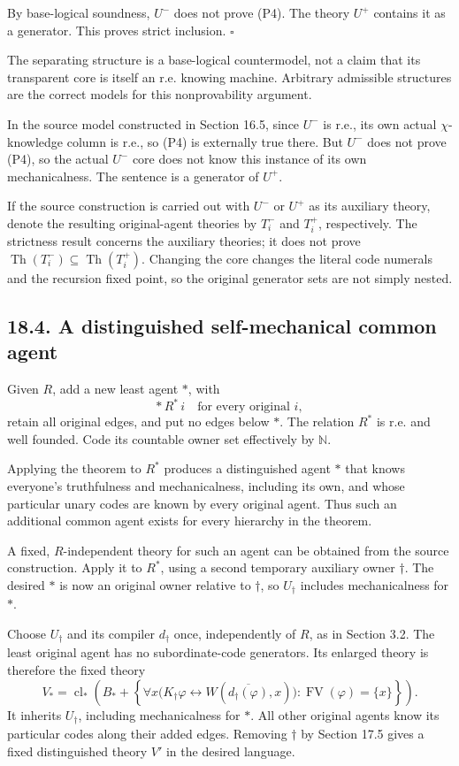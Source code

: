 \documentclass[
  11pt,
  letterpaper,
]{article}
\begin{document}
By base-logical soundness, \(U^-\) does not prove (P4). The theory
\(U^+\) contains it as a generator. This proves strict inclusion.
\(\square\)

The separating structure is a base-logical countermodel, not a claim
that its transparent core is itself an r.e. knowing machine. Arbitrary
admissible structures are the correct models for this nonprovability
argument.

In the source model constructed in Section 16.5, since \(U^-\) is r.e.,
its own actual \(\chi\)-knowledge column is r.e., so (P4) is externally
true there. But \(U^-\) does not prove (P4), so the actual \(U^-\) core
does not know this instance of its own mechanicalness. The sentence is a
generator of \(U^+\).

If the source construction is carried out with \(U^-\) or \(U^+\) as its
auxiliary theory, denote the resulting original-agent theories by
\(T_i^-\) and \(T_i^+\), respectively. The strictness result concerns
the auxiliary theories; it does not prove
\(\operatorname{Th}(T_i^-)\subseteq\operatorname{Th}(T_i^+)\). Changing
the core changes the literal code numerals and the recursion fixed
point, so the original generator sets are not simply nested.

\subsection{18.4. A distinguished self-mechanical common
agent}\label{a-distinguished-self-mechanical-common-agent}

Given \(R\), add a new least agent \(*\), with \[
*\,R^*\,i\quad\text{for every original }i,
\] retain all original edges, and put no edges below \(*\). The relation
\(R^*\) is r.e. and well founded. Code its countable owner set
effectively by \(\mathbb N\).

Applying the theorem to \(R^*\) produces a distinguished agent \(*\)
that knows everyone's truthfulness and mechanicalness, including its
own, and whose particular unary codes are known by every original agent.
Thus such an additional common agent exists for every hierarchy in the
theorem.

A fixed, \(R\)-independent theory for such an agent can be obtained from
the source construction. Apply it to \(R^*\), using a second temporary
auxiliary owner \(\dagger\). The desired \(*\) is now an original owner
relative to \(\dagger\), so \(U_\dagger\) includes mechanicalness for
\(*\).

Choose \(U_\dagger\) and its compiler \(d_\dagger\) once, independently
of \(R\), as in Section 3.2. The least original agent has no
subordinate-code generators. Its enlarged theory is therefore the fixed
theory \[
V_*=
\operatorname{cl}_*\left(
 B_*+
 \left\{\forall x\bigl(
 K_\dagger\varphi\leftrightarrow
 W(\overline{d_\dagger(\varphi)},x)\bigr):
                       \operatorname{FV}(\varphi)=\{x\}\right\}
\right).
\tag{P5}
\] It inherits \(U_\dagger\), including mechanicalness for \(*\). All
other original agents know its particular codes along their added edges.
Removing \(\dagger\) by Section 17.5 gives a fixed distinguished theory
\(V'\) in the desired language.
\end{document}
